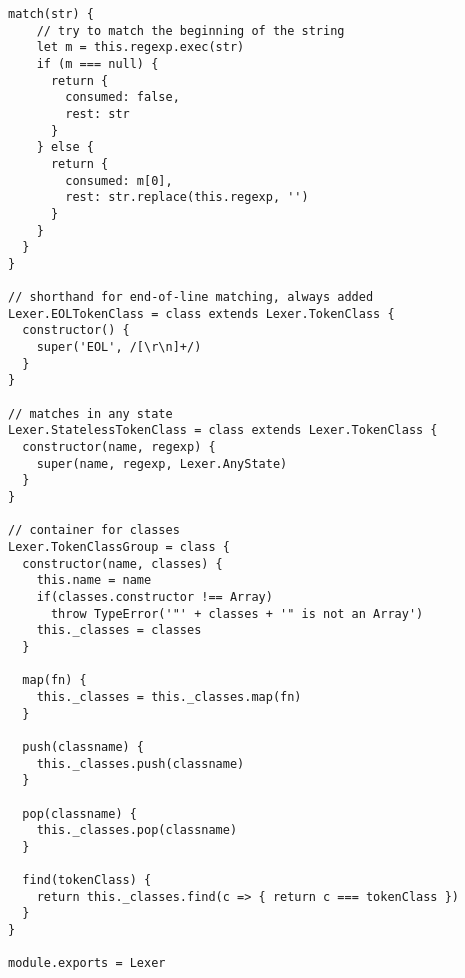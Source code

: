 \begin{lstlisting}[frame=single]
  match(str) {
    // try to match the beginning of the string
    let m = this.regexp.exec(str)
    if (m === null) {
      return {
        consumed: false,
        rest: str
      }
    } else {
      return {
        consumed: m[0],
        rest: str.replace(this.regexp, '')
      }
    }
  }
}

// shorthand for end-of-line matching, always added
Lexer.EOLTokenClass = class extends Lexer.TokenClass {
  constructor() {
    super('EOL', /[\r\n]+/)
  }
}

// matches in any state
Lexer.StatelessTokenClass = class extends Lexer.TokenClass {
  constructor(name, regexp) {
    super(name, regexp, Lexer.AnyState)
  }
}

// container for classes
Lexer.TokenClassGroup = class {
  constructor(name, classes) {
    this.name = name
    if(classes.constructor !== Array)
      throw TypeError('"' + classes + '" is not an Array')
    this._classes = classes
  }
  
  map(fn) {
    this._classes = this._classes.map(fn)
  }
  
  push(classname) {
    this._classes.push(classname)
  }
  
  pop(classname) {
    this._classes.pop(classname)
  }
  
  find(tokenClass) {
    return this._classes.find(c => { return c === tokenClass })
  }
}

module.exports = Lexer
\end{lstlisting}

